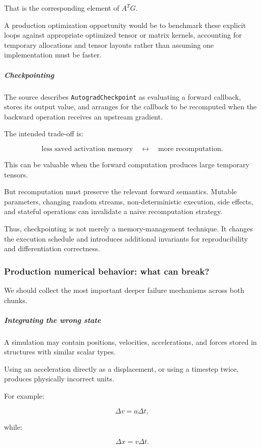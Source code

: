 That is the corresponding element of \(A^TG\).

A production optimization opportunity would be to benchmark these explicit loops against appropriate optimized tensor or matrix kernels, accounting for temporary allocations and tensor layouts rather than assuming one implementation must be faster.

\subparagraph{Checkpointing}\label{checkpointing}

The source describes \texttt{AutogradCheckpoint} as evaluating a forward callback, stores its output value, and arranges for the callback to be recomputed when the backward operation receives an upstream gradient.

The intended trade-off is:

\[
\text{less saved activation memory} \quad\longleftrightarrow\quad \text{more recomputation}.
\]

This can be valuable when the forward computation produces large temporary tensors.

But recomputation must preserve the relevant forward semantics. Mutable parameters, changing random streams, non-deterministic execution, side effects, and stateful operations can invalidate a naive recomputation strategy.

Thus, checkpointing is not merely a memory-management technique. It changes the execution schedule and introduces additional invariants for reproducibility and differentiation correctness.

\subsubsection{Production numerical behavior: what can break?}\label{production-numerical-behavior-what-can-break}

We should collect the most important deeper failure mechanisms across both chunks.

\subparagraph{Integrating the wrong state}\label{integrating-the-wrong-state}

A simulation may contain positions, velocities, accelerations, and forces stored in structures with similar scalar types.

Using an acceleration directly as a displacement, or using a timestep twice, produces physically incorrect units.

For example:

\[
\Delta v=a\Delta t,
\]

while:

\[
\Delta x=v\Delta t.
\]

